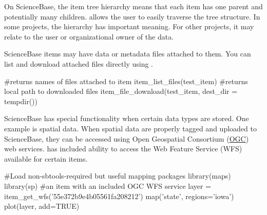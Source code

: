 On ScienceBase, the item tree hierarchy means that each item has one
parent and potentially many children.  allows the user to
easily traverse the tree structure. In some projects, the hierarchy has
important meaning. For other projects, it may relate to the user or
organizational owner of the data.



ScienceBase items may have data or metadata files attached to them.
You can list and download attached files directly using .

\begin{example}
#returns names of files attached to item
item_list_files(test_item)
#returns local path to downloaded files
item_file_download(test_item, dest_dir = tempdir())
\end{example}

ScienceBase has special functionality when certain data types are
stored. One example is spatial data. When spatial data are properly
tagged and uploaded to ScienceBase, they can be accessed using 
Open Geospatial Consortium (\href{http://www.opengeospatial.org/}{OGC}) 
web services.  has included ability to access the Web
Feature Service (WFS) available for certain items.

\begin{example}
#Load non-sbtools-required but useful mapping packages
library(maps)
library(sp)
#an item with an included OGC WFS service
layer = item_get_wfs('55e372b9e4b05561fa208212')
map('state', regions='iowa')
plot(layer, add=TRUE)
\end{example}

